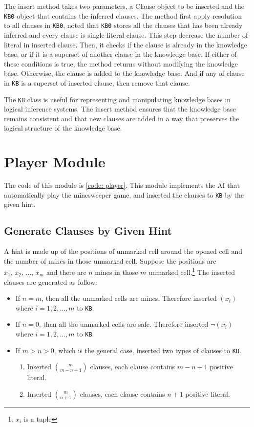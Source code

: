 \documentclass[twocolumn]{extarticle}
\begin{document}
The insert method takes two parameters, a Clause object to be inserted and the \texttt{KB0} object that contains the inferred clauses. The method first apply resolution to all clauses in \texttt{KB0}, noted that \texttt{KB0} stores all the clauses that has been already inferred and every clause is single-literal clause. This step decrease the number of literal in inserted clause. Then, it checks if the clause is already in the knowledge base, or if it is a superset of another clause in the knowledge base. If either of these conditions is true, the method returns without modifying the knowledge base. Otherwise, the clause is added to the knowledge base. And if any of clause in \texttt{KB} is a superset of inserted clause, then remove that clause. 

The \texttt{KB} class is useful for representing and manipulating knowledge bases in logical inference systems. The insert method ensures that the knowledge base remains consistent and that new clauses are added in a way that preserves the logical structure of the knowledge base.

\section{Player Module}

The code of this module is \autoref{code: player}. This module implements the AI that automatically play the minesweeper game, and inserted the clauses to \texttt{KB} by the given hint.

\subsection{Generate Clauses by Given Hint}

A hint is made up of the positions of unmarked cell around the opened cell and the number of mines in those unmarked cell. Suppose the positions are $x_1, \, x_2, \, \dots ,\, x_m$ and there are $n$ mines in those $m$ unmarked cell.\footnote{$x_i$ is a tuple} The inserted clauses are generated as follow:

\begin{itemize}
\item If $n = m$, then all the unmarked cells are mines. Therefore inserted $(x_i)$ where $i = 1, 2, \dots, m$ to \texttt{KB}.
\item If $n = 0$, then all the unmarked cells are safe. Therefore inserted $\neg (x_i)$ where $i = 1, 2, \dots, m$ to \texttt{KB}.
\item If $m > n > 0$, which is the general case, inserted two types of clauses to \texttt{KB}.
\begin{enumerate}
\item Inserted $m \choose m-n+1$ clauses, each clause contains $m-n+1$ positive literal.
\item Inserted $m \choose n+1$ clauses, each clause contains $n+1$ positive literal.
\end{enumerate}
\end{itemize}
\end{document}
